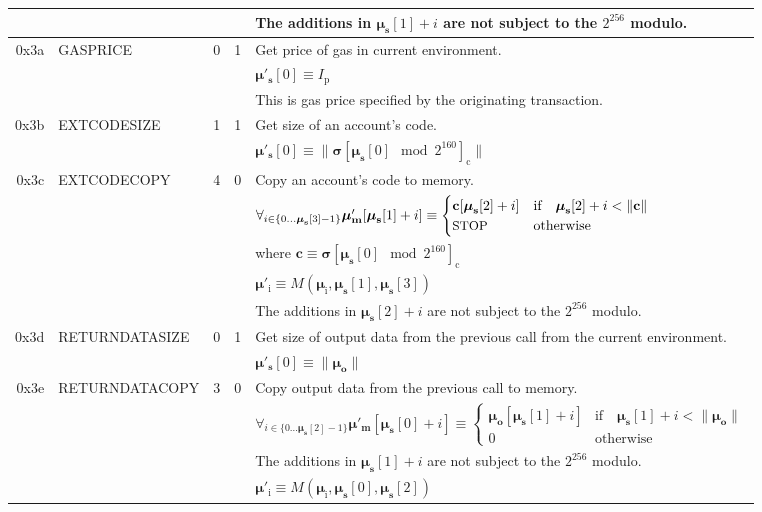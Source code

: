 \documentclass[9pt,oneside]{amsart}
\begin{document}
\begin{tabular*}{\columnwidth}[h]{rlrrl}
&&&& The additions in $\boldsymbol{\mu}_{\mathbf{s}}[1] + i$ are not subject to the $2^{256}$ modulo. \\
\midrule
0x3a & {\small GASPRICE} & 0 & 1 & Get price of gas in current environment. \\
&&&& $\boldsymbol{\mu}'_{\mathbf{s}}[0] \equiv I_{\mathrm{p}}$ \\
&&&& This is gas price specified by the originating transaction.\\
\midrule
0x3b & {\small EXTCODESIZE} & 1 & 1 & Get size of an account's code. \\
&&&& $\boldsymbol{\mu}'_{\mathbf{s}}[0] \equiv \lVert \boldsymbol{\sigma}[\boldsymbol{\mu}_{\mathbf{s}}[0] \mod 2^{160}]_{\mathrm{c}} \rVert$ \\
\midrule
0x3c & {\small EXTCODECOPY} & 4 & 0 & Copy an account's code to memory. \\
&&&& $\forall_{i \in \{ 0 \dots \boldsymbol{\mu}_{\mathbf{s}}[3] - 1\} } \boldsymbol{\mu}'_{\mathbf{m}}[\boldsymbol{\mu}_{\mathbf{s}}[1] + i ] \equiv
\begin{cases} \mathbf{c}[\boldsymbol{\mu}_{\mathbf{s}}[2] + i] & \text{if} \quad \boldsymbol{\mu}_{\mathbf{s}}[2] + i < \lVert \mathbf{c} \rVert \\ \text{\small STOP} & \text{otherwise} \end{cases}$\\
&&&& where $\mathbf{c} \equiv \boldsymbol{\sigma}[\boldsymbol{\mu}_{\mathbf{s}}[0] \mod 2^{160}]_{\mathrm{c}}$ \\
&&&& $\boldsymbol{\mu}'_{\mathrm{i}} \equiv M(\boldsymbol{\mu}_{\mathrm{i}}, \boldsymbol{\mu}_{\mathbf{s}}[1], \boldsymbol{\mu}_{\mathbf{s}}[3])$ \\
&&&& The additions in $\boldsymbol{\mu}_{\mathbf{s}}[2] + i$ are not subject to the $2^{256}$ modulo. \\
\midrule
0x3d & {\small RETURNDATASIZE} & 0 & 1 & Get size of output data from the previous call from the current environment. \\
&&&& $\boldsymbol{\mu}'_{\mathbf{s}}[0] \equiv \lVert \boldsymbol{\mu}_{\mathbf{o}} \rVert$ \\
\midrule
0x3e & {\small RETURNDATACOPY} & 3 & 0 & Copy output data from the previous call to memory. \\
&&&& $\forall_{i \in \{ 0 \dots \boldsymbol{\mu}_{\mathbf{s}}[2] - 1\} } \boldsymbol{\mu}'_{\mathbf{m}}[\boldsymbol{\mu}_{\mathbf{s}}[0] + i ] \equiv
\begin{cases} \boldsymbol{\mu}_{\mathbf{o}}[\boldsymbol{\mu}_{\mathbf{s}}[1] + i] & \text{if} \quad \boldsymbol{\mu}_{\mathbf{s}}[1] + i < \lVert \boldsymbol{\mu}_{\mathbf{o}} \rVert \\ 0 & \text{otherwise} \end{cases}$\\
&&&& The additions in $\boldsymbol{\mu}_{\mathbf{s}}[1] + i$ are not subject to the $2^{256}$ modulo. \\
&&&& $\boldsymbol{\mu}'_{\mathrm{i}} \equiv M(\boldsymbol{\mu}_{\mathrm{i}}, \boldsymbol{\mu}_{\mathbf{s}}[0], \boldsymbol{\mu}_{\mathbf{s}}[2])$ \\
\bottomrule
\end{tabular*}
\end{document}
